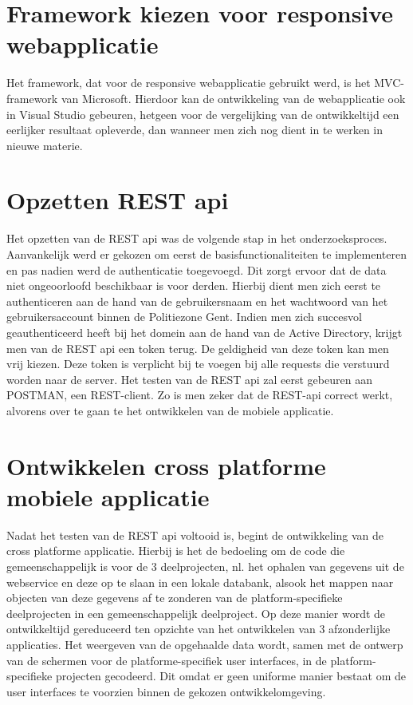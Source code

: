 \section{Framework kiezen voor responsive webapplicatie}
Het framework, dat voor de responsive webapplicatie gebruikt werd, is het MVC-framework van Microsoft.
Hierdoor kan de ontwikkeling van de webapplicatie ook in Visual Studio gebeuren, hetgeen voor de vergelijking van de ontwikkeltijd
een eerlijker resultaat opleverde, dan wanneer men zich nog dient in te werken in nieuwe materie.

\section{Opzetten REST api}
Het opzetten van de REST api was de volgende stap in het onderzoeksproces. Aanvankelijk werd er gekozen om eerst de basisfunctionaliteiten te implementeren en
pas nadien werd de authenticatie toegevoegd. Dit zorgt ervoor dat de data niet ongeoorloofd beschikbaar is voor derden.
Hierbij dient men zich eerst te authenticeren aan de hand van de gebruikersnaam en het wachtwoord van het gebruikersaccount binnen de Politiezone Gent.
Indien men zich succesvol geauthenticeerd heeft bij het domein aan de hand van de Active Directory, krijgt men van de REST api een token terug. De geldigheid van deze token kan men vrij kiezen.
Deze token is verplicht bij te voegen bij alle requests die verstuurd worden naar de server.
Het testen van de REST api zal eerst gebeuren aan POSTMAN, een REST-client. Zo is men zeker dat de REST-api correct werkt, alvorens over te gaan te het ontwikkelen van de mobiele applicatie.

\section{Ontwikkelen cross platforme mobiele applicatie}
Nadat het testen van de REST api voltooid is, begint de ontwikkeling van de cross platforme applicatie.
Hierbij is het de bedoeling om de code die gemeenschappelijk is voor de 3 deelprojecten,
nl. het ophalen van gegevens uit de webservice en deze op te slaan in een lokale databank, alsook het mappen naar objecten van deze gegevens
 af te zonderen van de platform-specifieke deelprojecten in een gemeenschappelijk deelproject.
 Op deze manier wordt de ontwikkeltijd gereduceerd ten opzichte van het ontwikkelen van 3 afzonderlijke applicaties.
Het weergeven van de opgehaalde data wordt, samen met de ontwerp van de schermen voor de platforme-specifiek user interfaces,
in de platform-specifieke projecten gecodeerd. Dit omdat er geen uniforme manier bestaat om de user interfaces te voorzien binnen
de gekozen ontwikkelomgeving.


